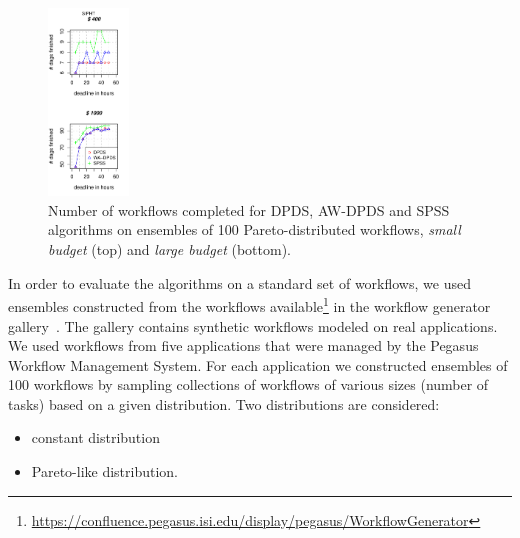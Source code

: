 \documentclass{sig-alternate}
\begin{document}
\begin{figure}[t]
\includegraphics[width=0.19\textwidth]{figures/pareto-SIPHT-n-1000-8-dagh5-50m0.pdf}
\caption{Number of workflows completed for DPDS, AW-DPDS and SPSS
algorithms on ensembles of 100 Pareto-distributed workflows, {\em small budget}
(top) and {\em large budget} (bottom).}
\label{fig:number-complete-pareto}
\end{figure}


In order to evaluate the algorithms on a standard set of workflows, we used
ensembles constructed from the workflows available\footnote{\url{https://confluence.pegasus.isi.edu/display/pegasus/WorkflowGenerator}}
in the workflow generator gallery~\cite{Bharathi08}. The gallery contains synthetic
workflows modeled on real applications. We used workflows from five applications 
that were managed by the Pegasus Workflow Management System. For each
application we constructed ensembles of 100 workflows by sampling collections of
workflows of various sizes (number of tasks) based on a given distribution.
Two distributions are considered:

\begin{itemize}
  \item constant distribution
  \item Pareto-like distribution.
\end{itemize}
\end{document}
